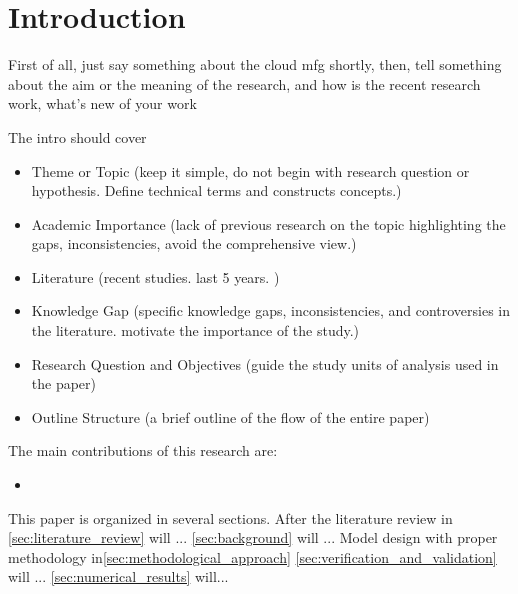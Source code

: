 \section{Introduction}
First of all, just say something about the cloud mfg shortly,
then, tell something about the aim or the meaning of the research,
and how is the recent research work, what's new of your work 


The intro should cover 
\begin{itemize}
	\item Theme or Topic (keep it simple, do not begin with research question or hypothesis. Define technical terms and constructs concepts.)
	\item Academic Importance (lack of previous research on the topic highlighting the gaps, inconsistencies, avoid the comprehensive view.)
	\item Literature (recent studies. last 5 years. )
	\item Knowledge Gap (specific knowledge gaps, inconsistencies, and controversies in the literature. motivate the importance of the study.)
	\item Research Question and Objectives (guide the study units of analysis used in the paper)
	\item Outline Structure (a brief outline of the flow of the entire paper)
\end{itemize}


The main contributions of this research are:
\begin{itemize}
	\item 
\end{itemize}


This paper is organized in several sections. 
After the literature review in \autoref{sec:literature_review} will ... 
\autoref{sec:background} will ... 
Model design with proper methodology in\autoref{sec:methodological_approach}
\autoref{sec:verification_and_validation} will ... 
\autoref{sec:numerical_results} will...
